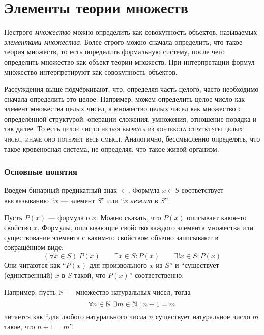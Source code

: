 \part{Элементы теории множеств}

\begin{fullwidth}
  \begin{multicols}{2}
    Нестрого {\it множество} можно определить как совокупность объектов,
    называемых {\it элементами множества}.
    Более строго можно сначала определить, что такое теория множеств, то есть
    определить формальную систему, после чего определить множество как
    объект теории множеств. При интерпретации формул множество интерпретируют
    как совокупность объектов.

    Рассуждения выше подчёркивают, что, определяя часть целого, часто
    необходимо сначала определить это целое. Например, можем определить целое число
    как элемент множества целых чисел, а множество целых чисел как множество
    с определённой структурой: операции сложения, умножения,
    отношение порядка и так далее. То есть \textsc{целое число нельзя вырвать
      из контекста струтктуры целых чисел, иначе оно потеряет весь смысл.}
    Аналогично, бессмысленно определять, что такое кровеносная система,
    не определяя, что такое живой организм.
  \end{multicols}
\end{fullwidth}

\section{Основные понятия}

Введём бинарный предикатный знак $\in$. Формула ${x\in S}$
соответствует высказыванию ``$x$ --- элемент $S$'' или
``$x$ {\it лежит} в $S$''.

Пусть $P(x)$ --- формула о $x$. Можно сказать, что $P(x)$ описывает какое-то
свойство $x$.
Формулы, описывающие свойство каждого элемента множества или
существование элемента с каким-то свойством обычно записывают в сокращённом виде:
\[
  (\forall x\in S)~P(x)\qquad
  \exists x\in S:P(x)\qquad \exists!x\in S:P(x)
\]
Они читаются как ``$P(x)$ для произвольного $x$ из $S$'' и
``существует (единственный) $x$ в $S$ такой, что $P(x)$'' соответственно.

Например, пусть $\mathbb N$ --- множество натуральных чисел, тогда
\[
  \forall n\in\mathbb N~\exists m\in\mathbb N:n+1=m
\]
читается как ``для любого натурального числа $n$ существует натуральное число
$m$ такое, что $n+1=m$''.

